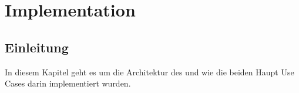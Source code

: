 \chapter{Implementation}
\label{chap:Implementation}

\section{Einleitung}
In diesem Kapitel geht es um die Architektur des \tool und wie die beiden Haupt Use Cases darin implementiert wurden.


\clearpage

 
\clearpage

 